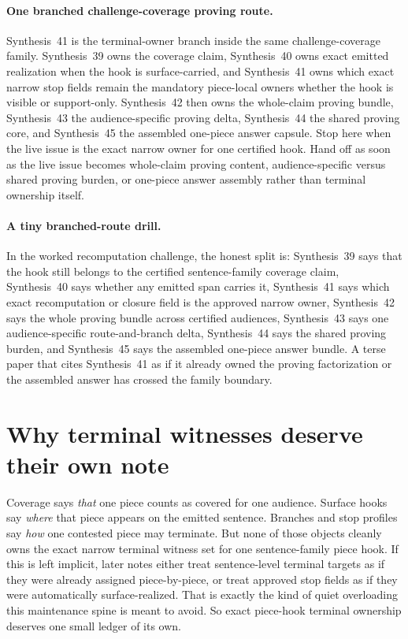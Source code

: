 \documentclass[11pt]{article}
\begin{document}
\paragraph{One branched challenge-coverage proving route.}
Synthesis~41 is the terminal-owner branch inside the same challenge-coverage family. Synthesis~39 owns the coverage claim, Synthesis~40 owns exact emitted realization when the hook is surface-carried, and Synthesis~41 owns which exact narrow stop fields remain the mandatory piece-local owners whether the hook is visible or support-only. Synthesis~42 then owns the whole-claim proving bundle, Synthesis~43 the audience-specific proving delta, Synthesis~44 the shared proving core, and Synthesis~45 the assembled one-piece answer capsule. Stop here when the live issue is the exact narrow owner for one certified hook. Hand off as soon as the live issue becomes whole-claim proving content, audience-specific versus shared proving burden, or one-piece answer assembly rather than terminal ownership itself.

\paragraph{A tiny branched-route drill.}
In the worked recomputation challenge, the honest split is: Synthesis~39 says that the hook still belongs to the certified sentence-family coverage claim, Synthesis~40 says whether any emitted span carries it, Synthesis~41 says which exact recomputation or closure field is the approved narrow owner, Synthesis~42 says the whole proving bundle across certified audiences, Synthesis~43 says one audience-specific route-and-branch delta, Synthesis~44 says the shared proving burden, and Synthesis~45 says the assembled one-piece answer bundle. A terse paper that cites Synthesis~41 as if it already owned the proving factorization or the assembled answer has crossed the family boundary.

\section{Why terminal witnesses deserve their own note}
Coverage says \emph{that} one piece counts as covered for one audience.
Surface hooks say \emph{where} that piece appears on the emitted sentence.
Branches and stop profiles say \emph{how} one contested piece may terminate.
But none of those objects cleanly owns the exact narrow terminal witness set for one sentence-family piece hook.
If this is left implicit, later notes either treat sentence-level terminal targets as if they were already assigned piece-by-piece, or treat approved stop fields as if they were automatically surface-realized.
That is exactly the kind of quiet overloading this maintenance spine is meant to avoid.
So exact piece-hook terminal ownership deserves one small ledger of its own.
\end{document}

